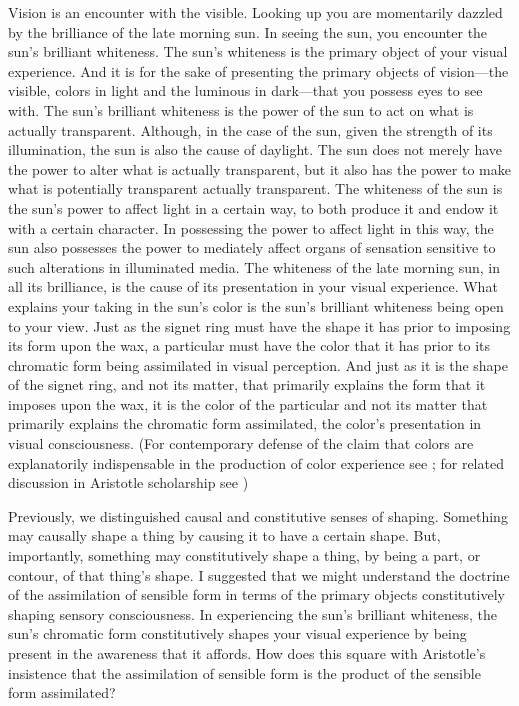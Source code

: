 Vision is an encounter with the visible. Looking up you are momentarily dazzled by the brilliance of the late morning sun. In seeing the sun, you encounter the sun's brilliant whiteness. The sun's whiteness is the primary object of your visual experience. And it is for the sake of presenting the primary objects of vision---the visible, colors in light and the luminous in dark---that you possess eyes to see with. The sun's brilliant whiteness is the power of the sun to act on what is actually transparent. Although, in the case of the sun, given the strength of its illumination, the sun is also the cause of daylight. The sun does not merely have the power to alter what is actually transparent, but it also has the power to make what is potentially transparent actually transparent. The whiteness of the sun is the sun's power to affect light in a certain way, to both produce it and endow it with a certain character. In possessing the power to affect light in this way, the sun also possesses the power to mediately affect organs of sensation sensitive to such alterations in illuminated media. The whiteness of the late morning sun, in all its brilliance, is the cause of its presentation in your visual experience. What explains your taking in the sun's color is the sun's brilliant whiteness being open to your view. Just as the signet ring must have the shape it has prior to imposing its form upon the wax, a particular must have the color that it has prior to its chromatic form being assimilated in visual perception. And just as it is the shape of the signet ring, and not its matter, that primarily explains the form that it imposes upon the wax, it is the color of the particular and not its matter that primarily explains the chromatic form assimilated, the color's presentation in visual consciousness. (For contemporary defense of the claim that colors are explanatorily indispensable in the production of color experience see \citealt{Campbell:1997dq,Broackes:1997pa}; for related discussion in Aristotle scholarship see \citealt{Broadie:1993fk,Broackes:1999uq})

Previously, we distinguished causal and constitutive senses of shaping. Something may causally shape a thing by causing it to have a certain shape. But, importantly, something may constitutively shape a thing, by being a part, or contour, of that thing's shape. I suggested that we might understand the doctrine of the assimilation of sensible form in terms of the primary objects constitutively shaping sensory consciousness. In experiencing the sun's brilliant whiteness, the sun's chromatic form constitutively shapes your visual experience by being present in the awareness that it affords. How does this square with Aristotle's insistence that the assimilation of sensible form is the product of the sensible form assimilated?

